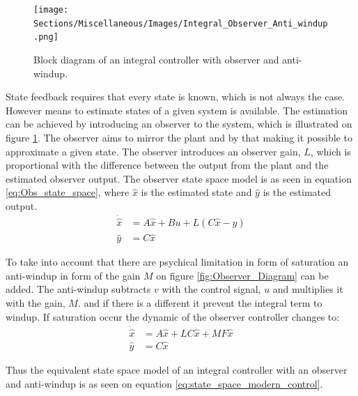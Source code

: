 \documentclass[../../main.tex]{subfiles}
\begin{document}
\begin{figure}
    \centering
    \texttt{[image: Sections/Miscellaneous/Images/Integral\_Observer\_Anti\_windup.png]}
    \caption{Block diagram of an integral controller with observer and anti-windup.}
    \label{fig:Integral_Observer_Diagram}
\end{figure}

State feedback requires that every state is known, which is not always the case. However means to estimate states of a given system is available. The estimation can be achieved by introducing an observer to the system, which is illustrated on figure \ref{fig:Integral_Observer_Diagram}. The observer aims to mirror the plant and by that making it possible to approximate a given state.
The observer introduces an observer gain, $L$, which is proportional with the difference between the output from the plant and the estimated observer output. The observer state space model is as seen in equation \ref{eq:Obs_state_space}, where $\hat{x}$ is the estimated state and $\hat{y}$ is the estimated output.
\begin{equation}\label{eq:Obs_state_space}
    \begin{split}
        \Dot{\hat{x}}&=A\hat{x}+Bu+L(C\hat{x}-y)\\
        \hat{y}&=C\hat{x}
    \end{split}
\end{equation}

To take into account that there are psychical limitation in form of saturation an anti-windup in form of the gain $M$ on figure \ref{fig:Observer_Diagram} can be added. The anti-windup subtracts $v$ with the control signal, $u$ and multiplies it with the gain, $M$. and if there is a different it prevent the integral term to windup. 
If saturation occur the dynamic of the observer controller changes to:
\begin{equation}\label{eq:anti-windup_state_space}
    \begin{split}
        \Dot{\hat{x}}&=A\hat{x}+LC\hat{x}+MF\hat{x}\\
        \hat{y}&=C\hat{x}
    \end{split}
\end{equation}

Thus the equivalent state space model of an integral controller with an observer and anti-windup is as seen on equation \ref{eq:state_space_modern_control}.
\end{document}
